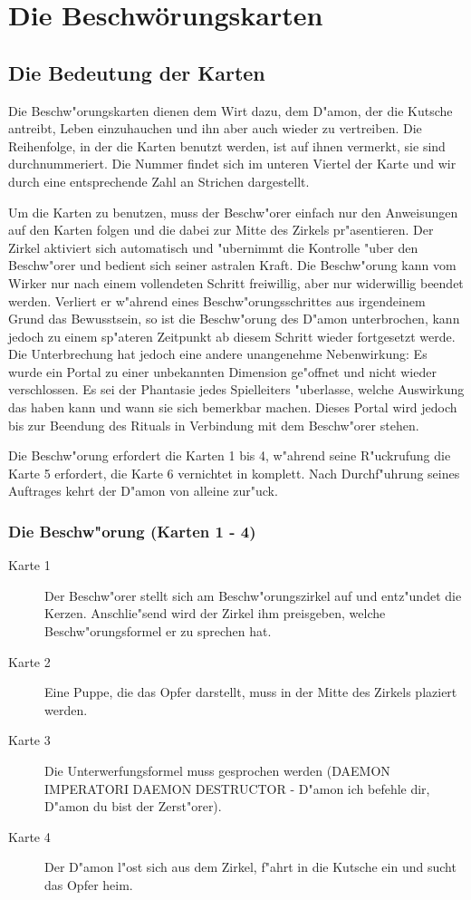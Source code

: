 \chapter{Die Beschwörungskarten}

\section{Die Bedeutung der Karten}
\par Die Beschw"orungskarten dienen dem Wirt dazu, dem D"amon, der die Kutsche antreibt, Leben einzuhauchen und ihn aber auch wieder zu vertreiben. Die Reihenfolge, in der die Karten benutzt werden, ist auf ihnen vermerkt, sie sind durchnummeriert. Die Nummer findet sich im unteren Viertel der Karte und wir durch eine entsprechende Zahl an Strichen dargestellt.
\par Um die Karten zu benutzen, muss der Beschw"orer einfach nur den Anweisungen auf den Karten folgen und die dabei zur Mitte des Zirkels pr"asentieren. Der Zirkel aktiviert sich automatisch und "ubernimmt die Kontrolle "uber den Beschw"orer und bedient sich seiner astralen Kraft. Die Beschw"orung kann vom Wirker nur nach einem vollendeten Schritt freiwillig, aber nur widerwillig beendet werden. Verliert er w"ahrend eines Beschw"orungsschrittes aus irgendeinem Grund das Bewusstsein, so ist die Beschw"orung des D"amon unterbrochen, kann jedoch zu einem sp"ateren Zeitpunkt ab diesem Schritt wieder fortgesetzt werde. Die Unterbrechung hat jedoch eine andere unangenehme Nebenwirkung: Es wurde ein Portal zu einer unbekannten Dimension ge"offnet und nicht wieder verschlossen. Es sei der Phantasie jedes Spielleiters "uberlasse, welche Auswirkung das haben kann und wann sie sich bemerkbar machen. Dieses Portal wird jedoch bis zur Beendung des Rituals in Verbindung mit dem Beschw"orer stehen.
\par Die Beschw"orung erfordert die Karten 1 bis 4, w"ahrend seine R"uckrufung die Karte 5 erfordert, die Karte 6 vernichtet in komplett. Nach Durchf"uhrung seines Auftrages kehrt der D"amon von alleine zur"uck.

\subsection{Die Beschw"orung (Karten 1 - 4)}
\begin{description}
\item [Karte 1] Der Beschw"orer stellt sich am Beschw"orungszirkel auf und entz"undet die Kerzen. Anschlie"send wird der Zirkel ihm preisgeben, welche Beschw"orungsformel er zu sprechen hat.
\item [Karte 2] Eine Puppe, die das Opfer darstellt, muss in der Mitte des Zirkels plaziert werden.
\item [Karte 3] Die Unterwerfungsformel muss gesprochen werden (DAEMON IMPERATORI DAEMON DESTRUCTOR - D"amon ich befehle dir, D"amon du bist der Zerst"orer).
\item [Karte 4] Der D"amon l"ost sich aus dem Zirkel, f"ahrt in die Kutsche ein und sucht das Opfer heim.
\end{description}

